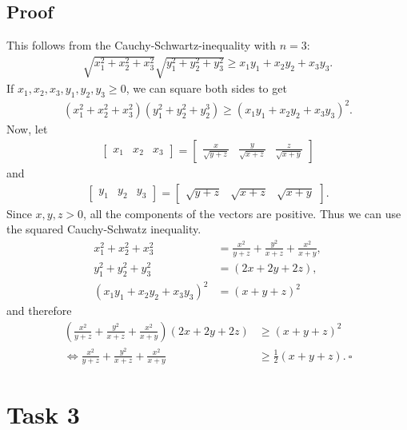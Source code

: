 \documentclass{article}
\begin{document}
\subsection*{Proof}
This follows from the Cauchy-Schwartz-inequality with $n=3$:
\begin{align*}
  \sqrt{x^2_1+x^2_2+x^2_3}\sqrt{y^2_1+y^2_2+ y^2_3}\geq x_1y_1+x_2y_2+ x_3y_3.
\end{align*}
If $x_1,x_2,x_3,y_1,y_2,y_3\geq 0$, we can square both sides to get
\begin{align*}
  (x^2_1+x^2_2+x^2_3)(y^2_1+y^2_2+y^3_2) \geq (x_1y_1+x_2y_2+x_3y_3)^2.
\end{align*}
Now, let
\begin{align*}
  \begin{bmatrix}
    x_1 & x_2 & x_3
  \end{bmatrix}
  =
  \begin{bmatrix}
    \frac{x}{\sqrt{y+z}}
     & \frac{y}{\sqrt{x+z}}
     & \frac{z}{\sqrt{x+y}}
  \end{bmatrix}
\end{align*}
and
\begin{align*}
  \begin{bmatrix}
    y_1 & y_2 & y_3
  \end{bmatrix}
  =
  \begin{bmatrix}
    \sqrt{y+z}
     & \sqrt{x+z}
     & \sqrt{x+y}
  \end{bmatrix}.
\end{align*}
Since $x,y,z>0$, all the components of the vectors are positive. Thus we can use the squared Cauchy-Schwatz inequality.
\begin{align*}
  x^2_1+x^2_2+x^2_3        & =\frac{x^2}{y+z}+\frac{y^2}{x+z}+\frac{x^2}{x+y}, \\
  y^2_1+y^2_2+y^2_3        & =(2x+2y+2z),                                      \\
  (x_1y_1+x_2y_2+x_3y_3)^2 & = (x+y+z)^2
\end{align*}
and therefore
\begin{align*}
  \left(\frac{x^2}{y+z}+\frac{y^2}{x+z}+\frac{x^2}{x+y}\right)\left(2x+2y+2z\right) & \geq (x+y+z)^2                    \\
  \Leftrightarrow \frac{x^2}{y+z}+\frac{y^2}{x+z}+\frac{x^2}{x+y}                   & \geq \frac{1}{2}(x+y+z).\:\square
\end{align*}
\section*{Task 3}
\end{document}
